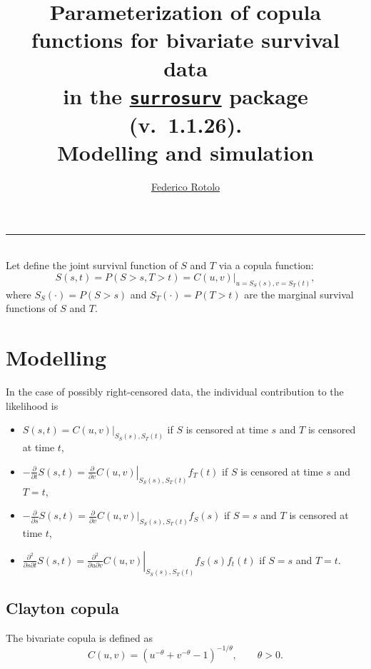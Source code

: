 \documentclass{article}
\title{Parameterization of copula functions for bivariate survival data \\
  in the \href{https://cran.r-project.org/package=surrosurv}{\texttt{surrosurv}} package (v.~1.1.26).\\
  Modelling and simulation}
\author{\href{mailto:Federico Rotolo <federico.rotolo@gustaveroussy.fr>
?Subject=R:::surrosurv}{Federico Rotolo}}
\begin{document}

\maketitle
\hrule~\\[1em]

Let define the joint survival function of $S$ and $T$
    via a copula function:
    \begin{equation}
    S(s, t) = P(S> s, T> t) = \left.C(u,v)\right|_{u = S_S(s), v = S_T(t)},
    \end{equation}
    where $S_S(\cdot)=P(S> s)$ and $S_T(\cdot)=P(T> t)$
    are the marginal survival functions of $S$ and $T$.

\section*{Modelling}
In the case of possibly right-censored data,
    the individual contribution to the likelihood is
\begin{itemize}
\item $S(s, t) = \left.C(u,v)\right|_{S_S(s), S_T(t)}$
    if $S$ is censored at time $s$ and $T$ is censored at time $t$,
\item $-\frac{\partial}{\partial t}S(s, t) = 
    \left.\frac{\partial}{\partial v} C(u,v)\right|_{S_S(s), S_T(t)} f_T(t)$
    if $S$ is censored at time $s$ and $T=t$,
\item $-\frac{\partial}{\partial s}S(s, t) =
    \frac{\partial}{\partial v}\left.C(u,v)\right|_{S_S(s), S_T(t)} f_S(s)$
    if $S=s$ and $T$ is censored at time $t$,
\item $\frac{\partial^2}{\partial s \partial t}S(s, t) = 
    \left.\frac{\partial^2}{\partial u \partial v}C(u,v)\right|_{S_S(s), S_T(t)}
    f_S(s)f_t(t)$ if $S=s$ and $T=t$.
\end{itemize}


\subsection*{Clayton copula}
The bivariate \cite{Clayton78} copula is defined as
\begin{equation}
    C(u,v)= \left(
        u^{-\theta} + v^{-\theta} - 1
        \right)^{-1/\theta}, \qquad \theta > 0.
\end{equation}
\end{document}
